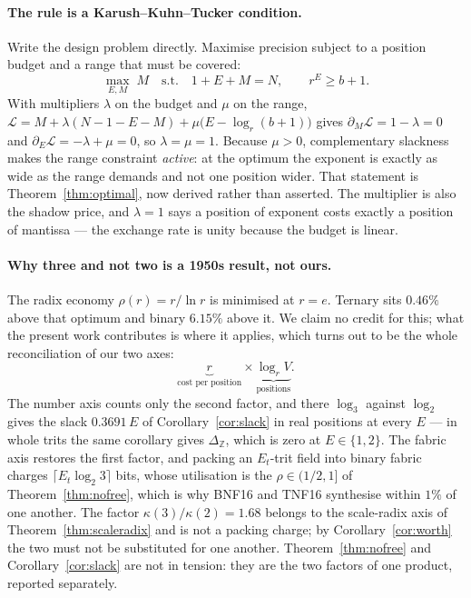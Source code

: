 \documentclass[11pt]{article}
\theoremstyle{definition}
\begin{document}
\paragraph{The rule is a Karush--Kuhn--Tucker condition.} Write the design problem
directly. Maximise precision subject to a position budget and a range that must be
covered:
\[
  \max_{E,M} \; M
  \quad\text{s.t.}\quad
  1 + E + M = N,
  \qquad
  r^{E} \ge b+1 .
\]
With multipliers $\lambda$ on the budget and $\mu$ on the range,
$\mathcal{L} = M + \lambda(N-1-E-M) + \mu\bigl(E - \log_r(b+1)\bigr)$ gives
$\partial_M \mathcal{L} = 1-\lambda = 0$ and $\partial_E \mathcal{L} = -\lambda+\mu = 0$,
so $\lambda = \mu = 1$. Because $\mu > 0$, complementary slackness makes the range
constraint \emph{active}: at the optimum the exponent is exactly as wide as the
range demands and not one position wider. That statement is
Theorem~\ref{thm:optimal}, now derived rather than asserted. The multiplier is
also the shadow price, and $\lambda = 1$ says a position of exponent costs exactly
a position of mantissa --- the exchange rate is unity because the budget is linear.

\paragraph{Why three and not two is a 1950s result, not ours.} The radix economy
$\rho(r) = r/\ln r$ is minimised at $r = e$. Ternary sits $0.46\%$ above that
optimum and binary $6.15\%$ above it. We claim no credit for this; what the present
work contributes is where it applies, which turns out to be the whole
reconciliation of our two axes:
\[
  \underbrace{r}_{\text{cost per position}} \times \underbrace{\log_r V}_{\text{positions}} .
\]
The number axis counts only the second factor, and there $\log_3$ against $\log_2$
gives the slack $0.3691\,E$ of Corollary~\ref{cor:slack} in real positions at every
$E$ --- in whole trits the same corollary gives $\Delta_{\mathbb{Z}}$, which is
zero at $E \in \{1,2\}$. The fabric axis restores the first factor, and packing an
$E_t$-trit field into binary fabric charges $\lceil E_t\log_2 3\rceil$ bits, whose
utilisation is the $\rho \in (1/2,1]$ of Theorem~\ref{thm:nofree}, which is why
BNF16 and TNF16 synthesise within $1\%$ of one another. The factor
$\kappa(3)/\kappa(2) = 1.68$ belongs to the scale-radix axis of
Theorem~\ref{thm:scaleradix} and is not a packing charge; by
Corollary~\ref{cor:worth} the two must not be substituted for one another. Theorem~\ref{thm:nofree} and
Corollary~\ref{cor:slack} are not in tension: they are the two factors of one
product, reported separately.
\end{document}
